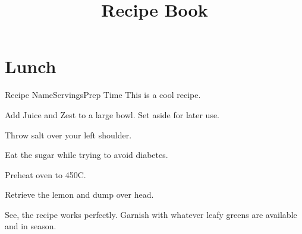 \documentclass[letterpage,9pt,twopage]{book}
\title{Recipe Book}
\date{}
\begin{document}
\maketitle
\tableofcontents

\part{Lunch}

\begin{recipe}{Recipe Name}{Servings}{Prep Time}
	\freeform
	This is a cool recipe.

	Add Juice and Zest to a large bowl.  Set aside for later use.

	Throw salt over your left shoulder.

	Eat the sugar while trying to avoid diabetes.

	\newstep
	Preheat oven to 450\degrees C.

	\newstep
	Retrieve the lemon and dump over head.

	\freeform
	See, the recipe works perfectly.
	Garnish with whatever leafy greens are available and in season.

\end{recipe}
\end{document}
